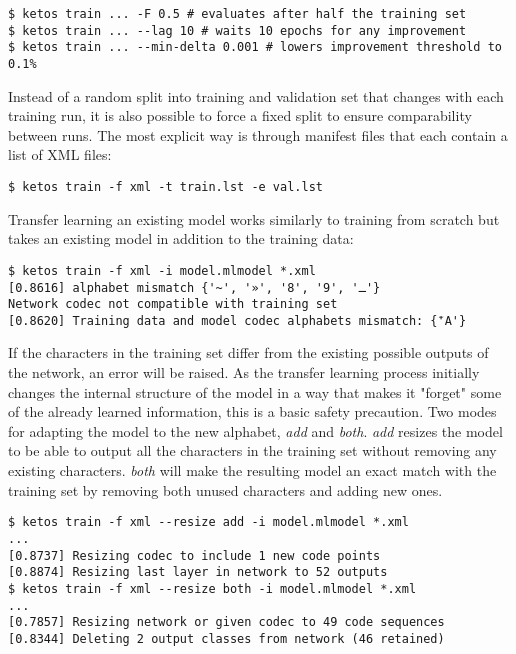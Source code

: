 \begin{verbatim}
$ ketos train ... -F 0.5 # evaluates after half the training set
$ ketos train ... --lag 10 # waits 10 epochs for any improvement
$ ketos train ... --min-delta 0.001 # lowers improvement threshold to 0.1%
\end{verbatim}

Instead of a random split into training and validation set that changes with
each training run, it is also possible to force a fixed split to ensure
comparability between runs. The most explicit way  is through manifest files
that each contain a list of XML files:

\begin{verbatim}
$ ketos train -f xml -t train.lst -e val.lst
\end{verbatim}

Transfer learning an existing model works similarly to training from scratch
but takes an existing model in addition to the training data:

\begin{verbatim}
$ ketos train -f xml -i model.mlmodel *.xml
[0.8616] alphabet mismatch {'~', '»', '8', '9', 'ـ'}
Network codec not compatible with training set
[0.8620] Training data and model codec alphabets mismatch: {'ٓA'}
\end{verbatim}

If the characters in the training set differ from the existing possible outputs
of the network, an error will be raised. As the transfer learning process
initially changes the internal structure of the model in a way that makes it
"forget" some of the already learned information, this is a basic safety
precaution. Two modes for adapting the model to the new alphabet, \emph{add}
and \emph{both}. \emph{add} resizes the model to be able to output all the
characters in the training set without removing any existing characters.
\emph{both} will make the resulting model an exact match with the training set
by removing both unused characters and adding new ones.

\begin{verbatim}
$ ketos train -f xml --resize add -i model.mlmodel *.xml
...
[0.8737] Resizing codec to include 1 new code points
[0.8874] Resizing last layer in network to 52 outputs
$ ketos train -f xml --resize both -i model.mlmodel *.xml
...
[0.7857] Resizing network or given codec to 49 code sequences
[0.8344] Deleting 2 output classes from network (46 retained)
\end{verbatim}


